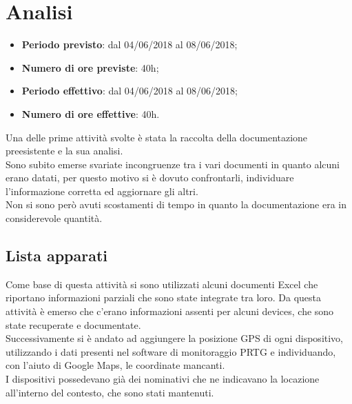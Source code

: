 \documentclass[Realizzazione.tex]{subfiles}
\begin{document}
\section{Analisi}

\begin{itemize}
	\item \textbf{Periodo previsto}: dal 04/06/2018 al 08/06/2018;
	\item \textbf{Numero di ore previste}: 40h;
	\item \textbf{Periodo effettivo}: dal 04/06/2018 al 08/06/2018;
	\item \textbf{Numero di ore effettive}: 40h.
\end{itemize}

Una delle prime attività svolte è stata la raccolta della documentazione preesistente e la sua analisi. \\
Sono subito emerse svariate incongruenze tra i vari documenti in quanto alcuni erano datati, per questo motivo si è dovuto confrontarli, individuare l'informazione corretta ed aggiornare gli altri. \\
Non si sono però avuti scostamenti di tempo in quanto la documentazione era in considerevole quantità.

\subsection{Lista apparati}
Come base di questa attività si sono utilizzati alcuni documenti Excel che riportano informazioni parziali che sono state integrate tra loro. Da questa attività è emerso che c'erano informazioni assenti per alcuni devices, che sono state recuperate e documentate. \\
Successivamente si è andato ad aggiungere la posizione GPS di ogni dispositivo, utilizzando i dati presenti nel software di monitoraggio PRTG e individuando, con l'aiuto di Google Maps, le coordinate mancanti. \\
I dispositivi possedevano già dei nominativi che ne indicavano la locazione all'interno del contesto, che sono stati mantenuti. \\
\end{document}
